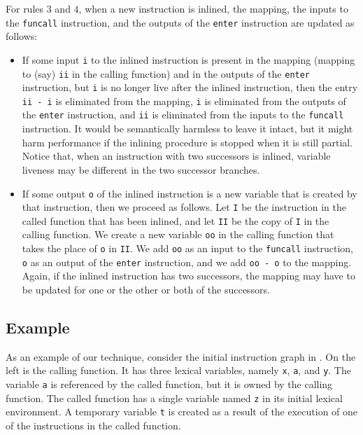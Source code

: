 For rules $3$ and $4$, when a new instruction is inlined, the mapping,
the inputs to the \texttt{funcall} instruction, and the outputs of the
\texttt{enter} instruction are updated as follows:

\begin{itemize}
\item If some input \texttt{i} to the inlined instruction is present
  in the mapping (mapping to (say) \texttt{ii} in the calling
  function) and in the outputs of the \texttt{enter} instruction, but
  \texttt{i} is no longer live after the inlined instruction, then the
  entry \texttt{ii - i} is eliminated from the mapping, \texttt{i} is
  eliminated from the outputs of the \texttt{enter} instruction, and
  \texttt{ii} is eliminated from the inputs to the \texttt{funcall}
  instruction.  It would be semantically harmless to leave it intact,
  but it might harm performance if the inlining procedure is stopped
  when it is still partial.  Notice that, when an instruction with two
  successors is inlined, variable liveness may be different in the two
  successor branches.
\item If some output \texttt{o} of the inlined instruction is a new
  variable that is created by that instruction, then we proceed as
  follows.  Let \texttt{I} be the instruction in the called function
  that has been inlined, and let \texttt{II} be the copy of \texttt{I}
  in the calling function.  We create a new variable \texttt{oo} in
  the calling function that takes the place of \texttt{o} in
  \texttt{II}.  We add \texttt{oo} as an input to the \texttt{funcall}
  instruction, \texttt{o} as an output of the \texttt{enter}
  instruction, and we add \texttt{oo - o} to the mapping.  Again, if
  the inlined instruction has two successors, the mapping may have to
  be updated for one or the other or both of the successors.
\end{itemize}

\subsection{Example}

As an example of our technique, consider the initial instruction graph
in .  On the left is the calling function.  It has three
lexical variables, namely \texttt{x}, \texttt{a}, and \texttt{y}.  The
variable \texttt{a} is referenced by the called function, but it is
owned by the calling function.  The called function has a single
variable named \texttt{z} in its initial lexical environment.  A
temporary variable \texttt{t} is created as a result of the execution
of one of the instructions in the called function.

